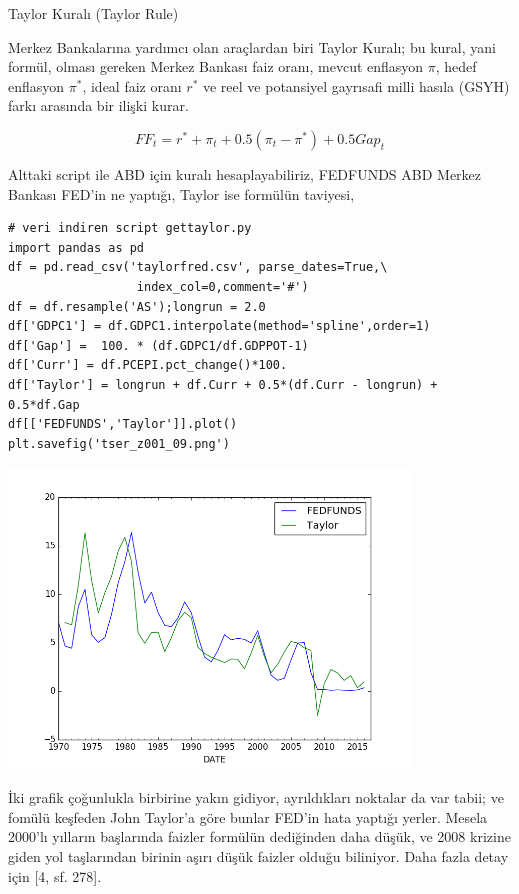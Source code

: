 \documentclass[12pt,fleqn]{article}\usepackage{../../common}
\begin{document}
Taylor Kuralı (Taylor Rule)

Merkez Bankalarına yardımcı olan araçlardan biri Taylor Kuralı; bu kural,
yani formül, olması gereken Merkez Bankası faiz oranı, mevcut enflasyon
$\pi$, hedef enflasyon $\pi^\ast$, ideal faiz oranı $r^\ast$ ve reel ve
potansiyel gayrısafi milli hasıla (GSYH) farkı arasında bir ilişki kurar.

$$
FF_t = r^\ast + \pi_t + 0.5 (\pi_t-\pi^\ast) + 0.5 Gap_t
$$

Alttaki script ile ABD için kuralı hesaplayabiliriz, FEDFUNDS ABD Merkez Bankası
FED'in ne yaptığı, Taylor ise formülün taviyesi,

\begin{verbatim}
# veri indiren script gettaylor.py 
import pandas as pd
df = pd.read_csv('taylorfred.csv', parse_dates=True,\
                  index_col=0,comment='#')
df = df.resample('AS');longrun = 2.0
df['GDPC1'] = df.GDPC1.interpolate(method='spline',order=1)
df['Gap'] =  100. * (df.GDPC1/df.GDPPOT-1)
df['Curr'] = df.PCEPI.pct_change()*100.
df['Taylor'] = longrun + df.Curr + 0.5*(df.Curr - longrun) + 0.5*df.Gap
df[['FEDFUNDS','Taylor']].plot()
plt.savefig('tser_z001_09.png')
\end{verbatim}

\includegraphics[height=8cm]{tser_z001_09.png}

İki grafik çoğunlukla birbirine yakın gidiyor, ayrıldıkları noktalar da var
tabii; ve fomülü keşfeden John Taylor'a göre bunlar FED'in hata yaptığı
yerler. Mesela 2000'lı yılların başlarında faizler formülün dediğinden daha
düşük, ve 2008 krizine giden yol taşlarından birinin aşırı düşük faizler olduğu
biliniyor. Daha fazla detay için [4, sf. 278]. 

\newpage
\end{document}
